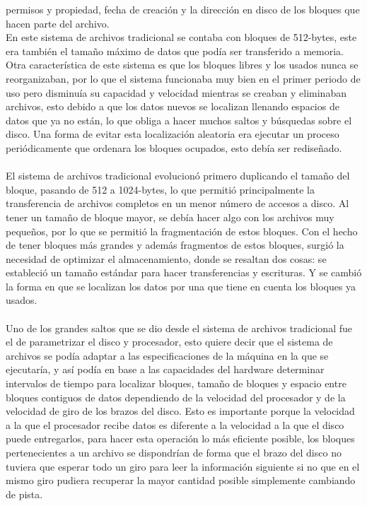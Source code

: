 \documentclass[]{article}
\begin{document}
permisos y propiedad, fecha de creación y la dirección en disco de los bloques que hacen parte del archivo.\\
En este sistema de archivos tradicional se contaba con bloques de 512-bytes, este era también
el tamaño máximo de datos que podía ser transferido a memoria. Otra característica de este sistema es que los bloques libres y los usados nunca se reorganizaban,
por lo que el sistema funcionaba muy bien en el primer periodo de uso pero disminuía su capacidad y velocidad mientras se creaban y eliminaban archivos, esto debido
a que los datos nuevos se localizan
llenando espacios de datos que ya no están, lo que obliga a hacer muchos saltos y búsquedas sobre el disco. Una forma de evitar esta localización aleatoria era ejecutar
un proceso periódicamente que ordenara los bloques ocupados, esto debía ser rediseñado.
\\ \\
El sistema de archivos tradicional evolucionó primero duplicando el tamaño del bloque, pasando de 512 a 1024-bytes, lo que permitió principalmente la transferencia de
archivos completos en un menor número de accesos a disco.
Al tener un tamaño de bloque mayor, se debía hacer algo con los archivos muy pequeños, por lo que se permitió la fragmentación de estos bloques.
Con el hecho de tener bloques más grandes y además fragmentos de estos bloques, surgió la necesidad de optimizar el almacenamiento, donde se resaltan dos cosas: 
se estableció un tamaño estándar para hacer transferencias y escrituras. Y se cambió la forma en que se localizan los datos por una que tiene en cuenta los bloques ya usados.
\\\\
Uno de los grandes saltos que se dio desde el sistema de archivos tradicional fue el de parametrizar el disco y procesador, esto quiere decir que el sistema de archivos
se podía adaptar a las especificaciones de la máquina en la que se ejecutaría, y así podía en base a las capacidades del hardware determinar intervalos de tiempo para
localizar bloques, tamaño de bloques y espacio entre bloques contiguos de datos dependiendo de la velocidad del procesador y de la velocidad de giro de los brazos
del disco. Esto es importante porque la velocidad a la que el procesador recibe datos es diferente a la velocidad a la que el disco puede entregarlos, para hacer esta
operación lo más eficiente posible, los bloques pertenecientes a un archivo se dispondrían de forma que el brazo del disco no tuviera que esperar todo un giro para leer
la información siguiente si no que en el mismo giro pudiera recuperar la mayor cantidad posible simplemente cambiando de pista.\\
\end{document}
